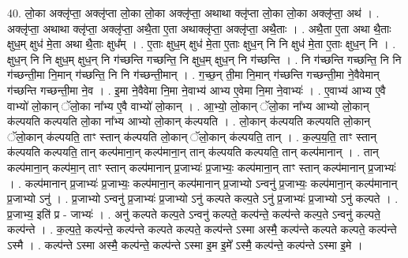 \documentclass[17pt]{extarticle}
\begin{document}
40. लो॒का अक्लृ॑प्ता॒ अक्लृ॑प्ता लो॒का लो॒का अक्लृ॑प्ता॒ अथाथा क्लृ॑प्ता लो॒का लो॒का अक्लृ॑प्ता॒ अथ॑ । . अक्लृ॑प्ता॒ अथाथा क्लृ॑प्ता॒ अक्लृ॑प्ता॒ अथै॒ता ए॒ता अथाक्लृ॑प्ता॒ अक्लृ॑प्ता॒ अथै॒ताः । . अथै॒ता ए॒ता अथा थै॒ताः क्षुध॒म् क्षुध॑ मे॒ता अथा थै॒ताः क्षुध᳚म् । . ए॒ताः क्षुध॒म् क्षुध॑ मे॒ता ए॒ताः क्षुध॒न् नि नि क्षुध॑ मे॒ता ए॒ताः क्षुध॒न् नि । . क्षुध॒न् नि नि क्षुध॒म् क्षुध॒न् नि ग॑च्छन्ति गच्छन्ति॒ नि क्षुध॒म् क्षुध॒न् नि ग॑च्छन्ति । . नि ग॑च्छन्ति गच्छन्ति॒ नि नि ग॑च्छन्ती॒मा नि॒मान् ग॑च्छन्ति॒ नि नि ग॑च्छन्ती॒मान् । . ग॒च्छ॒न् ती॒मा नि॒मान् ग॑च्छन्ति गच्छन्ती॒मा ने॒वैवेमान् ग॑च्छन्ति गच्छन्ती॒मा ने॒व । . इ॒मा ने॒वैवेमा नि॒मा ने॒वाभ्य॑ आभ्य ए॒वेमा नि॒मा ने॒वाभ्यः॑ । . ए॒वाभ्य॑ आभ्य ए॒वै वाभ्यो॑ लो॒कान् ॅलो॒का ना᳚भ्य ए॒वै वाभ्यो॑ लो॒कान् । . आ॒भ्यो॒ लो॒कान् ॅलो॒का ना᳚भ्य आभ्यो लो॒कान् क॑ल्पयति कल्पयति लो॒का ना᳚भ्य आभ्यो लो॒कान् क॑ल्पयति । . लो॒कान् क॑ल्पयति कल्पयति लो॒कान् ॅलो॒कान् क॑ल्पयति॒ ताꣳ स्तान् क॑ल्पयति लो॒कान् ॅलो॒कान् क॑ल्पयति॒ तान् । . क॒ल्प॒य॒ति॒ ताꣳ स्तान् क॑ल्पयति कल्पयति॒ तान् कल्प॑माना॒न् कल्प॑माना॒न् तान् क॑ल्पयति कल्पयति॒ तान् कल्प॑मानान् । . तान् कल्प॑माना॒न् कल्प॑मा॒न् ताꣳ स्तान् कल्प॑मानान् प्र॒जाभ्यः॑ प्र॒जाभ्यः॒ कल्प॑माना॒न् ताꣳ स्तान् कल्प॑मानान् प्र॒जाभ्यः॑ । . कल्प॑मानान् प्र॒जाभ्यः॑ प्र॒जाभ्यः॒ कल्प॑माना॒न् कल्प॑मानान् प्र॒जाभ्यो ऽन्वनु॑ प्र॒जाभ्यः॒ कल्प॑माना॒न् कल्प॑मानान् प्र॒जाभ्यो ऽनु॑ । . प्र॒जाभ्यो ऽन्वनु॑ प्र॒जाभ्यः॑ प्र॒जाभ्यो ऽनु॑ कल्पते कल्प॒ते ऽनु॑ प्र॒जाभ्यः॑ प्र॒जाभ्यो ऽनु॑ कल्पते । . प्र॒जाभ्य॒ इति॑ प्र - जाभ्यः॑ । . अनु॑ कल्पते कल्प॒ते ऽन्वनु॑ कल्पते॒ कल्प॑न्ते॒ कल्प॑न्ते कल्प॒ते ऽन्वनु॑ कल्पते॒ कल्प॑न्ते । . क॒ल्प॒ते॒ कल्प॑न्ते॒ कल्प॑न्ते कल्पते कल्पते॒ कल्प॑न्ते ऽस्मा अस्मै॒ कल्प॑न्ते कल्पते कल्पते॒ कल्प॑न्ते ऽस्मै । . कल्प॑न्ते ऽस्मा अस्मै॒ कल्प॑न्ते॒ कल्प॑न्ते ऽस्मा इ॒म इ॒मे᳚ ऽस्मै॒ कल्प॑न्ते॒ कल्प॑न्ते ऽस्मा इ॒मे । \newline
\pagebreak
{}
\end{document}
